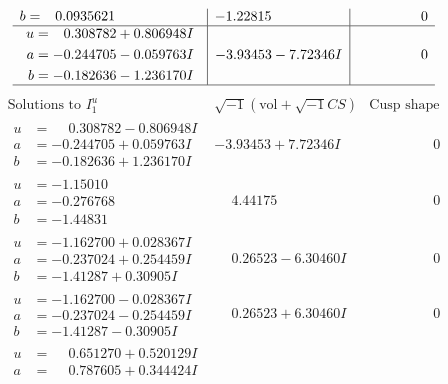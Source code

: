 \documentclass[1p]{elsarticle_modified}
\theoremstyle{definition}
\newcommand{\I}{\sqrt{-1}}
\begin{document}
$$\begin{array}{c|c|c}
\begin{aligned}
b &= \phantom{-}0.0935621\phantom{ +0.000000I}\end{aligned}
 & -1.22815\phantom{ +0.000000I} & \phantom{-0.000000 } 0 \\ \hline\begin{aligned}
u &= \phantom{-}0.308782 + 0.806948 I \\
a &= -0.244705 - 0.059763 I \\
b &= -0.182636 - 1.236170 I\end{aligned}
 & -3.93453 - 7.72346 I & \phantom{-0.000000 } 0\\
 \hline 
 \end{array}$$\newpage$$\begin{array}{c|c|c}  
\text{Solutions to }I^u_{1}& \I (\text{vol} + \sqrt{-1}CS) & \text{Cusp shape}\\
 \hline 
\begin{aligned}
u &= \phantom{-}0.308782 - 0.806948 I \\
a &= -0.244705 + 0.059763 I \\
b &= -0.182636 + 1.236170 I\end{aligned}
 & -3.93453 + 7.72346 I & \phantom{-0.000000 } 0 \\ \hline\begin{aligned}
u &= -1.15010\phantom{ +0.000000I} \\
a &= -0.276768\phantom{ +0.000000I} \\
b &= -1.44831\phantom{ +0.000000I}\end{aligned}
 & \phantom{-}4.44175\phantom{ +0.000000I} & \phantom{-0.000000 } 0 \\ \hline\begin{aligned}
u &= -1.162700 + 0.028367 I \\
a &= -0.237024 + 0.254459 I \\
b &= -1.41287 + 0.30905 I\end{aligned}
 & \phantom{-}0.26523 - 6.30460 I & \phantom{-0.000000 } 0 \\ \hline\begin{aligned}
u &= -1.162700 - 0.028367 I \\
a &= -0.237024 - 0.254459 I \\
b &= -1.41287 - 0.30905 I\end{aligned}
 & \phantom{-}0.26523 + 6.30460 I & \phantom{-0.000000 } 0 \\ \hline\begin{aligned}
u &= \phantom{-}0.651270 + 0.520129 I \\
a &= \phantom{-}0.787605 + 0.344424 I \\

\end{aligned}
\end{array}$$
\end{document}

